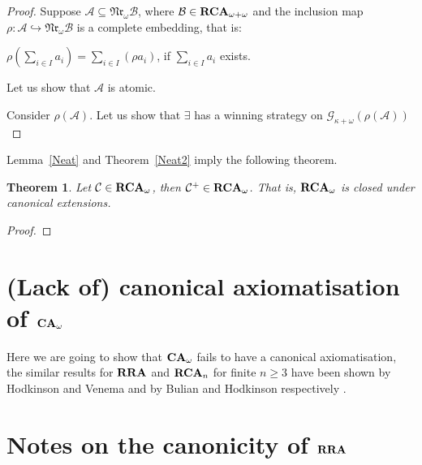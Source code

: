 \documentclass[a4paper]{article}
\theoremstyle{defin}
\theoremstyle{theorem}
\newtheorem{theorem}{Theorem}
\theoremstyle{prop}
\theoremstyle{lemma}
\theoremstyle{fact}
\theoremstyle{ex}
\theoremstyle{col}
\begin{document}
\begin{proof}
  Suppose $\mathcal{A} \subseteq \mathfrak{Nr}_{\omega} \mathcal{B}$, where $\mathcal{B} \in {\bf RCA}_{\omega + \omega}$ and the inclusion map $\rho : \mathcal{A} \hookrightarrow \mathfrak{Nr}_{\omega} \mathcal{B}$ is a complete embedding, that is:
  \begin{center}
    $\rho (\sum \limits_{i \in I} a_i) = \sum \limits_{i \in I} (\rho a_i)$, if $\sum \limits_{i \in I} a_i$ exists.
  \end{center}

  Let us show that $\mathcal{A}$ is atomic.

  Consider $\rho(\mathcal{A})$. Let us show that $\exists$ has a winning strategy on $\mathcal{G}_{\kappa + \omega}(\rho(\mathcal{A}))$
\end{proof}

Lemma~\ref{Neat} and Theorem~\ref{Neat2} imply the following theorem.

\begin{theorem}
  Let $\mathcal{C} \in {\bf RCA}_{\omega}$, then $\mathcal{C}^{+} \in {\bf RCA}_{\omega}$. That is, ${\bf RCA}_{\omega}$ is closed under canonical extensions.
\end{theorem}

\begin{proof}

\end{proof}

\section{(Lack of) canonical axiomatisation of ${\bf CA}_{\omega}$}

Here we are going to show that ${\bf CA}_{\omega}$ fails to have a canonical axiomatisation, the similar results for ${\bf RRA}$ and ${\bf RCA}_n$ for finite $n \geq 3$ have been shown by Hodkinson and Venema \cite{hodkinson2005canonical} and by Bulian and Hodkinson respectively \cite{bulian2013bare}.

\section{Notes on the canonicity of ${\bf RRA}$}
\end{document}
